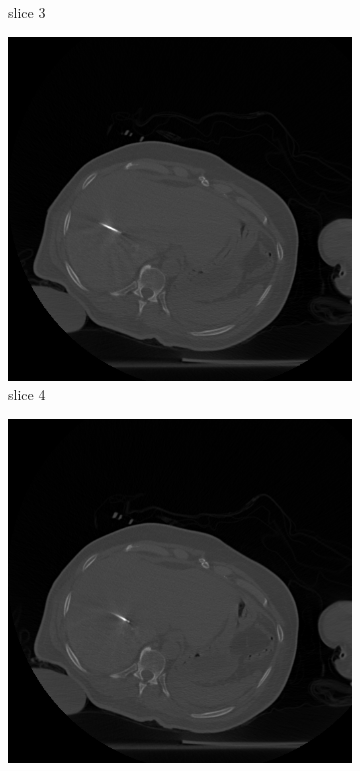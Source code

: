 \documentclass[journal]{IEEEtran}
\begin{document}
\begin{figure}[h!]
\begin{subfigure}[b]{0.24\linewidth}
 \caption{slice 3}
    \end{subfigure}
       \begin{subfigure}[b]{0.24\linewidth}
        \includegraphics[width=\textwidth]{../images/tmh/RFA2/template4.png}
 \caption{slice 4}
    \end{subfigure}
       \begin{subfigure}[b]{0.24\linewidth}
        \includegraphics[width=\textwidth]{../images/tmh/RFA2/template5.png}

\end{subfigure}
\end{figure}
\end{document}

